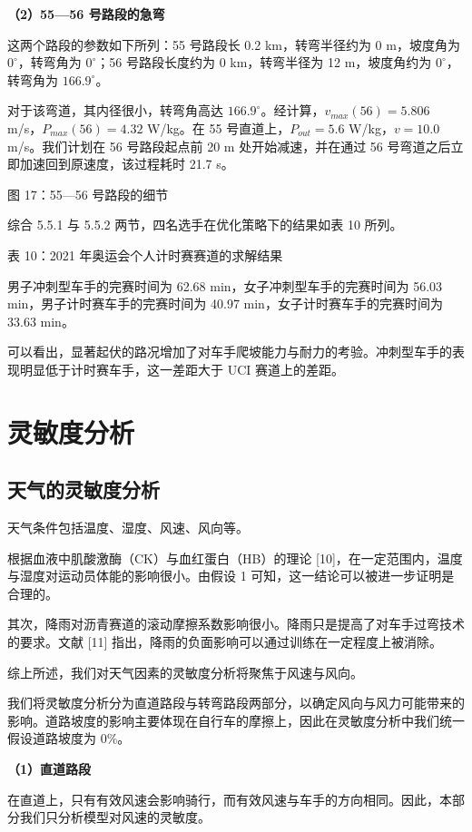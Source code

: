 \documentclass[11pt,a4paper]{ctexart}
\begin{document}
\textbf{（2）55—56 号路段的急弯}

这两个路段的参数如下所列：55 号路段长 0.2 km，转弯半径约为 0 m，坡度角为 $0^{\circ}$，转弯角为 $0^{\circ}$；56 号路段长度约为 0 km，转弯半径为 12 m，坡度角约为 $0^{\circ}$，转弯角为 $166.9^{\circ}$。

对于该弯道，其内径很小，转弯角高达 $166.9^{\circ}$。经计算，$v_{max}(56)=5.806$ m/s，$P_{max}(56)=4.32$ W/kg。在 55 号直道上，$P_{out}=5.6$ W/kg，$v=10.0$ m/s。我们计划在 56 号路段起点前 20 m 处开始减速，并在通过 56 号弯道之后立即加速回到原速度，该过程耗时 21.7 s。

图 17：55—56 号路段的细节

综合 5.5.1 与 5.5.2 两节，四名选手在优化策略下的结果如表 10 所列。

表 10：2021 年奥运会个人计时赛赛道的求解结果

男子冲刺型车手的完赛时间为 62.68 min，女子冲刺型车手的完赛时间为 56.03 min，男子计时赛车手的完赛时间为 40.97 min，女子计时赛车手的完赛时间为 33.63 min。

可以看出，显著起伏的路况增加了对车手爬坡能力与耐力的考验。冲刺型车手的表现明显低于计时赛车手，这一差距大于 UCI 赛道上的差距。

\section{灵敏度分析}

\subsection{天气的灵敏度分析}

天气条件包括温度、湿度、风速、风向等。

根据血液中肌酸激酶（CK）与血红蛋白（HB）的理论 [10]，在一定范围内，温度与湿度对运动员体能的影响很小。由假设 1 可知，这一结论可以被进一步证明是合理的。

其次，降雨对沥青赛道的滚动摩擦系数影响很小。降雨只是提高了对车手过弯技术的要求。文献 [11] 指出，降雨的负面影响可以通过训练在一定程度上被消除。

综上所述，我们对天气因素的灵敏度分析将聚焦于风速与风向。

我们将灵敏度分析分为直道路段与转弯路段两部分，以确定风向与风力可能带来的影响。道路坡度的影响主要体现在自行车的摩擦上，因此在灵敏度分析中我们统一假设道路坡度为 0\%。

\textbf{（1）直道路段}

在直道上，只有有效风速会影响骑行，而有效风速与车手的方向相同。因此，本部分我们只分析模型对风速的灵敏度。
\end{document}
